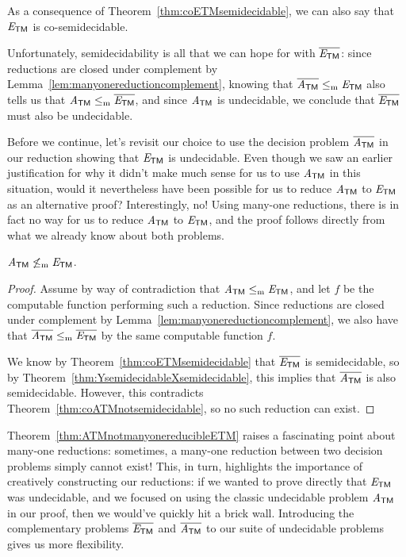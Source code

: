 As a consequence of Theorem~\ref{thm:coETMsemidecidable}, we can also say that $\mathit{E}_{\textsf{TM}}$ is co-semidecidable.

Unfortunately, semidecidability is all that we can hope for with $\overline{\mathit{E}_{\textsf{TM}}}$: since reductions are closed under complement by Lemma~\ref{lem:manyonereductioncomplement}, knowing that $\overline{\mathit{A}_{\textsf{TM}}} \leq_{\mathrm{m}} \mathit{E}_{\textsf{TM}}$ also tells us that $\mathit{A}_{\textsf{TM}} \leq_{\mathrm{m}} \overline{\mathit{E}_{\textsf{TM}}}$, and since $\mathit{A}_{\textsf{TM}}$ is undecidable, we conclude that $\overline{\mathit{E}_{\textsf{TM}}}$ must also be undecidable.

Before we continue, let's revisit our choice to use the decision problem $\overline{\mathit{A}_{\textsf{TM}}}$ in our reduction showing that $\mathit{E}_{\textsf{TM}}$ is undecidable. Even though we saw an earlier justification for why it didn't make much sense for us to use $\mathit{A}_{\textsf{TM}}$ in this situation, would it nevertheless have been possible for us to reduce $\mathit{A}_{\textsf{TM}}$ to $\mathit{E}_{\textsf{TM}}$ as an alternative proof? Interestingly, no! Using many-one reductions, there is in fact no way for us to reduce $\mathit{A}_{\textsf{TM}}$ to $\mathit{E}_{\textsf{TM}}$, and the proof follows directly from what we already know about both problems.

\begin{theorem}\label{thm:ATMnotmanyonereducibleETM}
$\mathit{A}_{\textsf{TM}} \not\leq_{\mathrm{m}} \mathit{E}_{\textsf{TM}}$.

\begin{proof}
Assume by way of contradiction that $\mathit{A}_{\textsf{TM}} \leq_{\mathrm{m}} \mathit{E}_{\textsf{TM}}$, and let $f$ be the computable function performing such a reduction. Since reductions are closed under complement by Lemma~\ref{lem:manyonereductioncomplement}, we also have that $\overline{\mathit{A}_{\textsf{TM}}} \leq_{\mathrm{m}} \overline{\mathit{E}_{\textsf{TM}}}$ by the same computable function $f$.

We know by Theorem~\ref{thm:coETMsemidecidable} that $\overline{\mathit{E}_{\textsf{TM}}}$ is semidecidable, so by Theorem~\ref{thm:YsemidecidableXsemidecidable}, this implies that $\overline{\mathit{A}_{\textsf{TM}}}$ is also semidecidable. However, this contradicts Theorem~\ref{thm:coATMnotsemidecidable}, so no such reduction can exist.
\end{proof}
\end{theorem}

Theorem~\ref{thm:ATMnotmanyonereducibleETM} raises a fascinating point about many-one reductions: sometimes, a many-one reduction between two decision problems simply cannot exist! This, in turn, highlights the importance of creatively constructing our reductions: if we wanted to prove directly that $\mathit{E}_{\textsf{TM}}$ was undecidable, and we focused on using the classic undecidable problem $\mathit{A}_{\textsf{TM}}$ in our proof, then we would've quickly hit a brick wall. Introducing the complementary problems $\overline{\mathit{E}_{\textsf{TM}}}$ and $\overline{\mathit{A}_{\textsf{TM}}}$ to our suite of undecidable problems gives us more flexibility.


